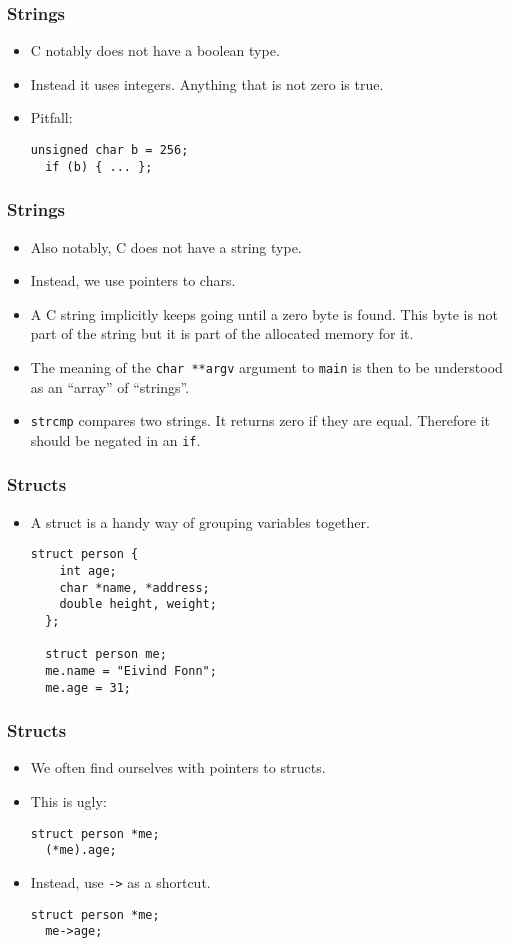 \begin{frame}[fragile]
  \frametitle{Strings}
  \begin{itemize}
  \item C notably does not have a boolean type.
  \item Instead it uses integers. Anything that is not zero is true.
  \item Pitfall:
\begin{lstlisting}[style=c]
  unsigned char b = 256;
  if (b) { ... };
\end{lstlisting}
  \end{itemize}
\end{frame}

\begin{frame}[fragile]
  \frametitle{Strings}
  \begin{itemize}
  \item Also notably, C does not have a string type.
  \item Instead, we use pointers to chars.
  \item A C string implicitly keeps going until a zero byte is found. This byte
    is not part of the string but it is part of the allocated memory for it.
  \item The meaning of the \texttt{char **argv} argument to \texttt{main} is
    then to be understood as an ``array'' of ``strings''.
  \item \texttt{strcmp} compares two strings. It returns zero if they are equal.
    Therefore it should be negated in an \texttt{if}.
  \end{itemize}
\end{frame}

\begin{frame}[fragile]
  \frametitle{Structs}
  \begin{itemize}
  \item A struct is a handy way of grouping variables together.
\begin{lstlisting}[style=c]
  struct person {
    int age;
    char *name, *address;
    double height, weight;
  };

  struct person me;
  me.name = "Eivind Fonn";
  me.age = 31;
\end{lstlisting}
  \end{itemize}
\end{frame}

\begin{frame}[fragile]
  \frametitle{Structs}
  \begin{itemize}
  \item We often find ourselves with pointers to structs.
  \item This is ugly:
\begin{lstlisting}[style=c]
  struct person *me;
  (*me).age;
\end{lstlisting}
  \item Instead, use \texttt{->} as a shortcut.
\begin{lstlisting}[style=c]
  struct person *me;
  me->age;
\end{lstlisting}
  \end{itemize}
\end{frame}

